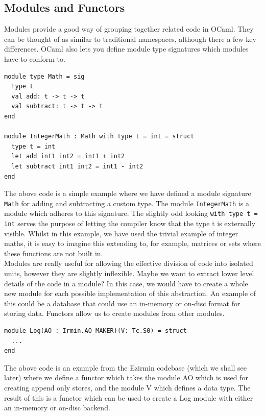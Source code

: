 \documentclass[12pt,a4paper,twoside,openright]{report}
\begin{document}
		\subsection*{Modules and Functors}
		Modules provide a good way of grouping together related code in OCaml.
		They can be thought of as similar to traditional namespaces, although there a few key differences.
		OCaml also lets you define module type signatures which modules have to conform to.
		\begin{lstlisting}
module type Math = sig
  type t
  val add: t -> t -> t
  val subtract: t -> t -> t
end

module IntegerMath : Math with type t = int = struct 
  type t = int
  let add int1 int2 = int1 + int2
  let subtract int1 int2 = int1 - int2
end
		\end{lstlisting}
		The above code is a simple example where we have defined a module signature \texttt{Math} for adding and subtracting a custom type.
		The module \texttt{IntegerMath} is a module which adheres to this signature. 
		The slightly odd looking \texttt{with type t = int} serves the purpose of letting the compiler know that the type t is externally visible.
		Whilst in this example, we have used the trivial example of integer maths, it is easy to imagine this extending to, for example, matrices or sets where these functions are not built in.\\

		Modules are really useful for allowing the effective division of code into isolated units, however they are slightly inflexible. 
		Maybe we want to extract lower level details of the code in a module?
		In this case, we would have to create a whole new module for each possible implementation of this abstraction.
		An example of this could be a database that could use an in-memory or on-disc format for storing data.
		Functors allow us to create modules from other modules.
		\begin{lstlisting}
module Log(AO : Irmin.AO_MAKER)(V: Tc.S0) = struct
  ...
end
		\end{lstlisting}
		The above code is an example from the Ezirmin codebase (which we shall see later) where we define a functor which takes the module AO which is used for creating append only stores, and the module V which defines a data type.
		The result of this is a functor which can be used to create a Log module with either an in-memory or on-disc backend.
\end{document}

